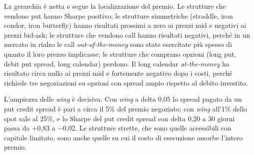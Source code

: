 \documentclass[11pt,a4paper]{article}
\begin{document}
La gerarchia è netta e segue la localizzazione del premio. Le strutture che vendono put hanno Sharpe positivo; le strutture simmetriche (straddle, iron condor, iron butterfly) hanno risultati prossimi a zero ai prezzi mid e negativi ai prezzi bid-ask; le strutture che vendono call hanno risultati negativi, perché in un mercato in rialzo le call \emph{out-of-the-money} sono state esercitate più spesso di quanto il loro prezzo implicasse; le strutture che comprano opzioni (long put, debit put spread, long calendar) perdono. Il long calendar \emph{at-the-money} ha risultato circa nullo ai prezzi mid e fortemente negativo dopo i costi, perché richiede tre negoziazioni su opzioni con spread ampio rispetto al debito investito.

L'ampiezza delle \emph{wing} è decisiva. Con \emph{wing} a delta 0{,}05 lo spread pagato da un put credit spread è pari a circa il 5\% del premio negoziato; con \emph{wing} all'1\% dello spot sale al 25\%, e lo Sharpe del put credit spread con delta 0{,}20 a 30 giorni passa da +0{,}83 a $-$0{,}02. Le strutture strette, che sono quelle accessibili con capitale limitato, sono anche quelle su cui il costo di esecuzione assorbe l'intero premio.
\end{document}
